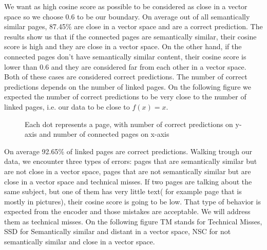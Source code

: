 \documentclass{article}
\begin{document}
We want as high cosine score as possible to be considered as close in a vector space so we choose 0.6 to be our boundary. On average out of all semantically similar pages, 87.45\% are close in a vector space and are a correct prediction. 
The results show us that if the connected pages are semantically similar, their cosine score is high and they are close in a vector space. On the other hand, if the connected pages don't have semantically similar content, their cosine score is lower than 0.6 and they are considered far from each other in a vector space. \newline
Both of these cases are considered correct predictions. The number of correct predictions depends on the number of linked pages. On the following figure we expected the number of correct predictions to be very close to the number of linked pages, i.e. our data to be close to \( f(x) = x\).

\begin{figure}[H]
\centering
{}
\caption{Each dot represents a page, with number of correct predictions on y-axis and number of connected pages on x-axis}
\end{figure}

On average 92.65\% of linked pages are correct predictions. 
Walking trough our data, we encounter three types of errors: pages that are semantically similar but are not close in a vector space, pages that are not semantically similar but are close in a vector space and technical misses. If two pages are talking about the same subject, but one of them has very little text( for example page that is mostly in pictures), their cosine score is going to be low. That type of behavior is expected from the encoder and those mistakes are acceptable. We will address them as technical misses.
On the following figure TM stands for Technical Misses, SSD for Semantically similar and distant in a vector space, NSC for not semantically similar and close in a vector space. 
\end{document}
